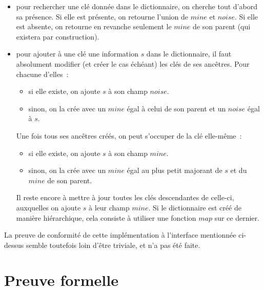 \documentclass{article}
\begin{document}
\begin{itemize}

\item pour rechercher une clé donnée dans le dictionnaire, on cherche tout
d'abord sa présence. Si elle est présente, on retourne l'union de
$mine$ et $noise$. Si elle est absente, on retourne
en revanche seulement le $mine$ de son parent (qui existera par
construction).

\item pour ajouter à une clé une information $s$ dans le
dictionnaire, il faut absolument modifier (et créer le cas échéant) les clés de
ses ancêtres. Pour chacune d'elles~:

\begin{itemize}

\item si elle existe, on ajoute $s$ à son champ
$noise$.

\item sinon, on la crée avec un $mine$ égal à celui de son parent
et un $noise$ égal à $s$.

\end{itemize}

Une fois tous ses ancêtres créés, on peut s'occuper de la clé elle-même~:

\begin{itemize}

\item si elle existe, on ajoute $s$ à son champ $mine$.

\item sinon, on la crée avec un $mine$ égal au plus petit majorant
de $s$ et du $mine$ de son parent.

\end{itemize}

Il reste encore à mettre à jour toutes les clés descendantes de celle-ci,
auxquelles on ajoute $s$ à leur champ $mine$. Si le
dictionnaire est créé de manière hiérarchique, cela consiste à utiliser une
fonction $map$ sur ce dernier.

\end{itemize}

La preuve de conformité de cette implémentation à l'interface mentionnée
ci-dessus semble toutefois loin d'être triviale, et n'a pas été faite.

\newpage
\section{Preuve formelle}
\end{document}
